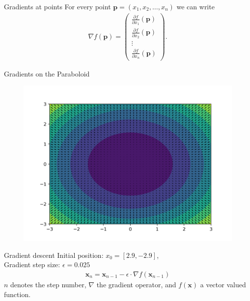 \documentclass{beamer}
\begin{document}
    \begin{frame}{Gradients at points}
      For every point $\mathbf{p} = (x_1, x_2, \dots , x_n)$ we can write
      \begin{align}
        \nabla f (\mathbf{p}) = \begin{pmatrix}
          \frac{\partial f}{\partial x_1} (\mathbf{p}) \\
          \frac{\partial f}{\partial x_2} (\mathbf{p}) \\
          \vdots \\
          \frac{\partial f}{\partial x_n} (\mathbf{p}) 
        \end{pmatrix}.
      \end{align}
    \end{frame}


    \begin{frame}{Gradients on the Paraboloid}
      \begin{figure}
        \includegraphics[width=.9\linewidth]{./figures/quiver_paraboloid.png}
      \end{figure}
    \end{frame}

    \begin{frame}{Gradient descent}
      Initial position: $x_0 = [2.9, -2.9]$, \\
      Gradient step size: $\epsilon = 0.025 $
      \begin{align}
        \mathbf{x}_n = \mathbf{x}_{n-1} - \epsilon \cdot \nabla f(\mathbf{x}_{n-1})
      \end{align}
      $n$ denotes the step number, $\nabla$ the gradient operator, and $f(\mathbf{x})$ a vector valued function.
    \end{frame}
\end{document}
